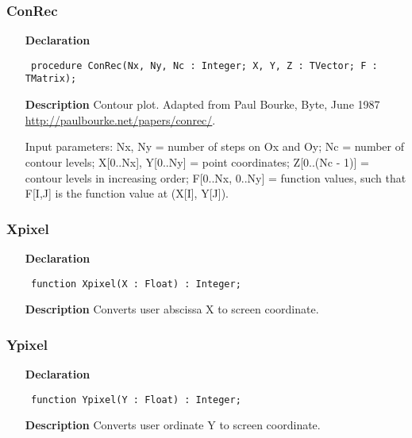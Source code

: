 \documentclass[12pt,a4paper,oneside]{report}
\newcommand{\declarationitem}[1]{\textbf{#1}}
\newcommand{\descriptiontitle}[1]{\textbf{#1}}
\newcommand{\code}[1]{\texttt{#1}}
\begin{document}
\subsubsection{ConRec}
\label{uplot-ConRec}
\begin{itemize}\item[\declarationitem{Declaration}\hfill]
	\begin{flushleft}
		\code{
			procedure ConRec(Nx, Ny, Nc : Integer; X, Y, Z : TVector; F : TMatrix);}
		
	\end{flushleft}
	
	\par
	\item[\descriptiontitle{Description}]
	Contour plot. Adapted from Paul Bourke, Byte, June 1987\\ \href{http://paulbourke.net/papers/conrec/}{http://paulbourke.net/papers/conrec/}.
	
	Input parameters: Nx, Ny = number of steps on Ox and Oy; Nc = number of contour levels; X[0..Nx], Y[0..Ny] = point coordinates; Z[0..(Nc {-} 1)] = contour levels in increasing order; F[0..Nx, 0..Ny] = function values, such that F[I,J] is the function value at (X[I], Y[J]).
	
\end{itemize}
\subsubsection{Xpixel}
\label{uplot-Xpixel}
\begin{itemize}\item[\declarationitem{Declaration}\hfill]
	\begin{flushleft}
		\code{
			function Xpixel(X : Float) : Integer;}
		
	\end{flushleft}
	
	\par
	\item[\descriptiontitle{Description}]
	Converts user abscissa X to screen coordinate.
	
\end{itemize}
\subsubsection{Ypixel}
\label{uplot-Ypixel}
\begin{itemize}\item[\declarationitem{Declaration}\hfill]
	\begin{flushleft}
		\code{
			function Ypixel(Y : Float) : Integer;}
		
	\end{flushleft}
	
	\par
	\item[\descriptiontitle{Description}]
	Converts user ordinate Y to screen coordinate.
	
\end{itemize}
\end{document}
